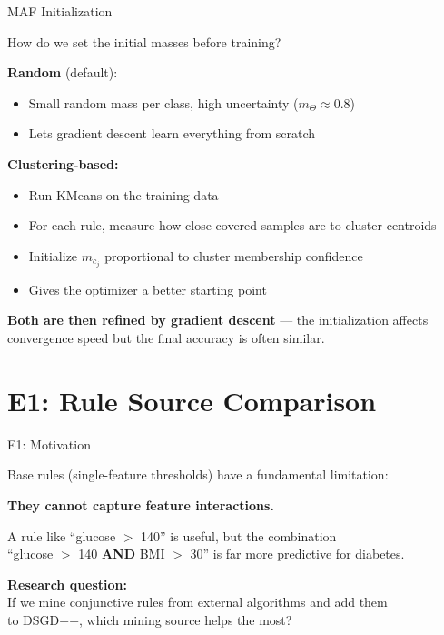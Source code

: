 \documentclass[aspectratio=169,12pt]{beamer}
\begin{document}
\begin{frame}{MAF Initialization}

How do we set the initial masses before training?

\vspace{1.5em}
\textbf{Random} (default):
\begin{itemize}
    \item Small random mass per class, high uncertainty ($m_\Theta \approx 0.8$)
    \item Lets gradient descent learn everything from scratch
\end{itemize}

\vspace{1em}
\textbf{Clustering-based:}
\begin{itemize}
    \item Run KMeans on the training data
    \item For each rule, measure how close covered samples are to cluster centroids
    \item Initialize $m_{c_j}$ proportional to cluster membership confidence
    \item Gives the optimizer a better starting point
\end{itemize}

\vspace{1em}
\textbf{Both are then refined by gradient descent} --- the initialization
affects convergence speed but the final accuracy is often similar.

\end{frame}


\section{E1: Rule Source Comparison}

\begin{frame}{E1: Motivation}

Base rules (single-feature thresholds) have a fundamental limitation:

\vspace{1em}
\textbf{They cannot capture feature interactions.}

\vspace{1em}
A rule like ``glucose $>$ 140'' is useful, but the combination\\
``glucose $>$ 140 \textbf{AND} BMI $>$ 30'' is far more predictive for diabetes.

\vspace{1.5em}
\textbf{Research question:}\\
If we mine conjunctive rules from external algorithms and add them\\
to DSGD++, which mining source helps the most?

\end{frame}
\end{document}
